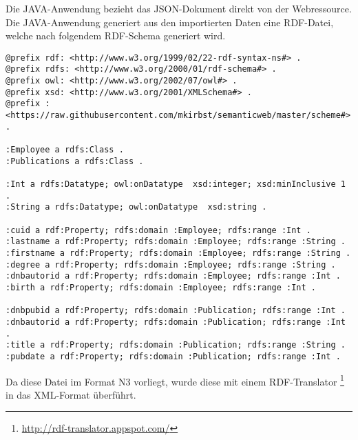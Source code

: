 \documentclass[parskip]{scrartcl}
\begin{document}
Die JAVA-Anwendung bezieht das JSON-Dokument direkt von der Webressource. Die JAVA-Anwendung generiert aus den importierten Daten eine RDF-Datei, welche nach folgendem RDF-Schema generiert wird.
\begin{lstlisting}[captionpos=b, caption=RDF-Schema der exportierten HTWK-Mitarbeiterdaten, label=RDF-Schema der exportierten HTWK-Mitarbeiterdaten]
@prefix rdf: <http://www.w3.org/1999/02/22-rdf-syntax-ns#> .
@prefix rdfs: <http://www.w3.org/2000/01/rdf-schema#> .
@prefix owl: <http://www.w3.org/2002/07/owl#> .
@prefix xsd: <http://www.w3.org/2001/XMLSchema#> .
@prefix : <https://raw.githubusercontent.com/mkirbst/semanticweb/master/scheme#> .
 
:Employee a rdfs:Class .
:Publications a rdfs:Class .

:Int a rdfs:Datatype; owl:onDatatype  xsd:integer; xsd:minInclusive 1 .
:String a rdfs:Datatype; owl:onDatatype  xsd:string .
 
:cuid a rdf:Property; rdfs:domain :Employee; rdfs:range :Int .
:lastname a rdf:Property; rdfs:domain :Employee; rdfs:range :String .
:firstname a rdf:Property; rdfs:domain :Employee; rdfs:range :String .
:degree a rdf:Property; rdfs:domain :Employee; rdfs:range :String .
:dnbautorid a rdf:Property; rdfs:domain :Employee; rdfs:range :Int .
:birth a rdf:Property; rdfs:domain :Employee; rdfs:range :Int .
 
:dnbpubid a rdf:Property; rdfs:domain :Publication; rdfs:range :Int .
:dnbautorid a rdf:Property; rdfs:domain :Publication; rdfs:range :Int .
:title a rdf:Property; rdfs:domain :Publication; rdfs:range :String .
:pubdate a rdf:Property; rdfs:domain :Publication; rdfs:range :Int .
\end{lstlisting}

Da diese Datei im Format N3 vorliegt, wurde diese mit einem RDF-Translator \footnote{\url{http://rdf-translator.appspot.com/} } in das XML-Format überführt.
\end{document}
